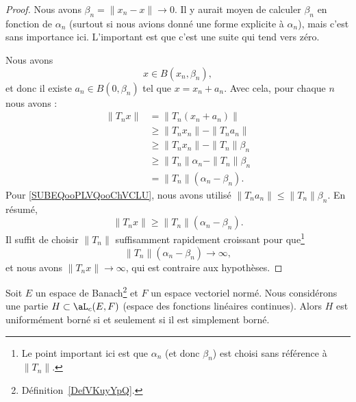 \begin{proof}
    Nous avons \( \beta_n=\| x_n-x \|\to 0\). Il y aurait moyen de calculer \( \beta_n\) en fonction de \( \alpha_n\) (surtout si nous avions donné une forme explicite à \( \alpha_n\)), mais c'est sans importance ici. L'important est que c'est une suite qui tend vers zéro.

    Nous avons
    \begin{equation}
        x\in B(x_n,\beta_n),
    \end{equation}
    et donc il existe \( a_n\in B(0,\beta_n)\) tel que \( x=x_n+a_n\). Avec cela, pour chaque \( n\) nous avons :
    \begin{subequations}
        \begin{align}
            \| T_nx \|&=\| T_n(x_n+a_n) \|\\
            &\geq\| T_nx_n \|-\| T_na_n \|\\
            &\geq \| T_nx_n \|-\| T_n \|\beta_n     \label{SUBEQooPLVQooChVCLU}\\
        &\geq \| T_n \|\alpha_n-\| T_n \|\beta_n\\
        &=\| T_n \|(\alpha_n-\beta_n).
        \end{align}
    \end{subequations}
    Pour \ref{SUBEQooPLVQooChVCLU}, nous avons utilisé \( \| T_na_n \|\leq \| T_n \|\beta_n\). En résumé,
    \begin{equation}
        \| T_nx \|\geq \| T_n \|(\alpha_n-\beta_n).
    \end{equation}
    Il suffit de choisir \( \| T_n \|\) suffisamment rapidement croissant pour que\footnote{Le point important ici est que \( \alpha_n\) (et donc \( \beta_n\)) est choisi sans référence à \( \| T_n \|\).}
    \begin{equation}
       \| T_n \|(\alpha_n-\beta_n)\to \infty,
    \end{equation}
    et nous avons \( \| T_nx \|\to \infty\), qui est contraire aux hypothèses.
\end{proof}

\begin{theorem} \label{ThoPFBMHBN}
    Soit \( E\) un espace de Banach\footnote{Définition~\ref{DefVKuyYpQ}.} et \( F\) un espace vectoriel normé. Nous considérons une partie \( H\subset \aL_c(E,F)\) (espace des fonctions linéaires continues). Alors \( H\) est uniformément borné si et seulement si il est simplement borné.
\end{theorem}


